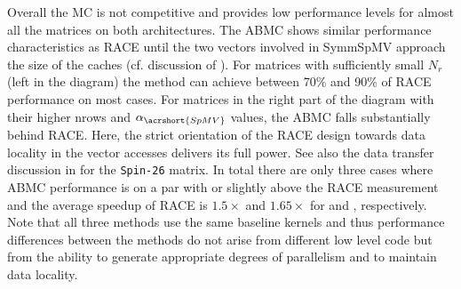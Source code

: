 %
Overall the \acrshort{MC} is not competitive and provides low performance levels for almost all the matrices on both architectures. The \acrshort{ABMC} shows similar performance characteristics as \acrshort{RACE} until the two vectors involved in \acrshort{SymmSpMV} approach the size of the caches (cf. discussion of ). For matrices with sufficiently small $N_r$ (left in the diagram) the method can achieve between 70\% and 90\% of \acrshort{RACE} performance on most cases. For matrices in the right part of the diagram with their higher \acrshort{nrows} and $\alpha_{\acrshort{SpMV}}$ values, the \acrshort{ABMC} falls substantially behind \acrshort{RACE}. Here, the strict orientation of the \acrshort{RACE} design towards data locality in the vector accesses delivers its full power. See also the data transfer discussion in  for the \texttt{Spin-26} matrix.
In total there are only three cases where \acrshort{ABMC} performance is on a par with or slightly above the \acrshort{RACE} measurement and the average speedup of \acrshort{RACE} is $1.5\times$ and $1.65 \times$ for \IVB and \SKX, respectively.
Note that all three methods use the same baseline kernels and thus performance differences between the methods do not arise from different low level code but from the ability to generate appropriate degrees of parallelism and to maintain data locality.

